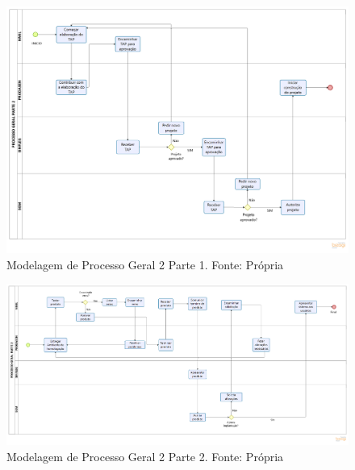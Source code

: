 \begin{apendicesenv}
    \begin{landscape}
        \begin{figure}[H]
            \centering
            \includegraphics[width=1.2\textwidth]{figuras/processoGeralParte21.png}
            \caption{Modelagem de Processo Geral 2 Parte 1. Fonte: Própria}
            \label{img:modelagemProcessoGeral2Parte1}
        \end{figure}
    \end{landscape}

    \begin{landscape}
        \begin{figure}[H]
            \centering
            \includegraphics[width=1.3\textwidth]{figuras/processoGeralParte22.png}
            \caption{Modelagem de Processo Geral 2 Parte 2. Fonte: Própria}
            \label{img:modelagemProcessoGeral2Parte2}
        \end{figure}
    \end{landscape}
    
\end{apendicesenv}